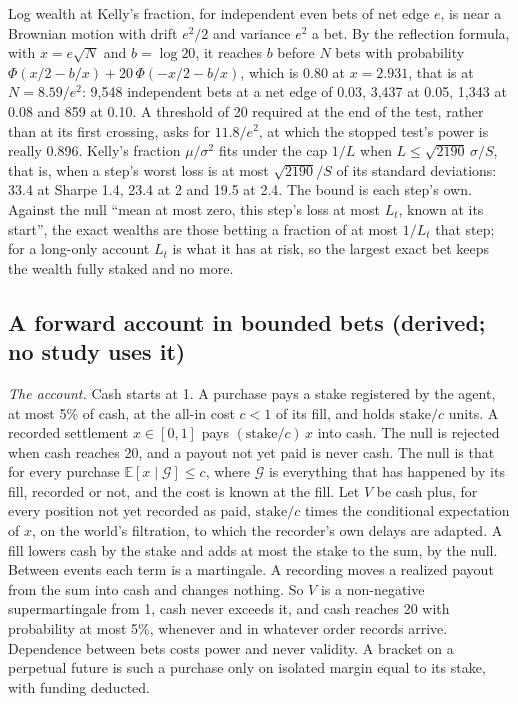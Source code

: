\documentclass[11pt]{article}
\newcommand{\E}{\mathbb{E}}
\begin{document}
Log wealth at Kelly's fraction, for independent even bets of net edge $e$, is near a Brownian motion with drift $e^2/2$ and variance $e^2$ a bet. By the reflection formula, with $x=e\sqrt N$ and $b=\log20$, it reaches $b$ before $N$ bets with probability $\Phi(x/2-b/x)+20\,\Phi(-x/2-b/x)$, which is 0.80 at $x=2.931$, that is at $N=8.59/e^2$: 9{,}548 independent bets at a net edge of 0.03, 3{,}437 at 0.05, 1{,}343 at 0.08 and 859 at 0.10. A threshold of 20 required at the end of the test, rather than at its first crossing, asks for $11.8/e^2$, at which the stopped test's power is really 0.896. Kelly's fraction $\mu/\sigma^2$ fits under the cap $1/L$ when $L\le\sqrt{2190}\,\sigma/S$, that is, when a step's worst loss is at most $\sqrt{2190}/S$ of its standard deviations: 33.4 at Sharpe 1.4, 23.4 at 2 and 19.5 at 2.4. The bound is each step's own. Against the null ``mean at most zero, this step's loss at most $L_t$, known at its start'', the exact wealths are those betting a fraction of at most $1/L_t$ that step; for a long-only account $L_t$ is what it has at risk, so the largest exact bet keeps the wealth fully staked and no more.

\subsection{A forward account in bounded bets (derived; no study uses it)}\label{app:thesis-events}

\emph{The account.} Cash starts at 1. A purchase pays a stake registered by the agent, at most 5\% of cash, at the all-in cost $c<1$ of its fill, and holds $\text{stake}/c$ units. A recorded settlement $x\in[0,1]$ pays $(\text{stake}/c)\,x$ into cash. The null is rejected when cash reaches 20, and a payout not yet paid is never cash. The null is that for every purchase $\E[x\mid\mathcal G]\le c$, where $\mathcal G$ is everything that has happened by its fill, recorded or not, and the cost is known at the fill. Let $V$ be cash plus, for every position not yet recorded as paid, $\text{stake}/c$ times the conditional expectation of $x$, on the world's filtration, to which the recorder's own delays are adapted. A fill lowers cash by the stake and adds at most the stake to the sum, by the null. Between events each term is a martingale. A recording moves a realized payout from the sum into cash and changes nothing. So $V$ is a non-negative supermartingale from 1, cash never exceeds it, and cash reaches 20 with probability at most 5\%, whenever and in whatever order records arrive. Dependence between bets costs power and never validity. A bracket on a perpetual future is such a purchase only on isolated margin equal to its stake, with funding deducted.
\end{document}
